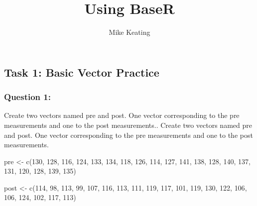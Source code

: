 \documentclass[
  letterpaper,
  DIV=11,
  numbers=noendperiod]{scrartcl}
\title{Using BaseR}
\author{Mike Keating}
\date{}
\newenvironment{Shaded}{\begin{snugshade}}{\end{snugshade}}
\newcommand{\DecValTok}[1]{\textcolor[rgb]{0.68,0.00,0.00}{#1}}
\newcommand{\FunctionTok}[1]{\textcolor[rgb]{0.28,0.35,0.67}{#1}}
\newcommand{\NormalTok}[1]{\textcolor[rgb]{0.00,0.23,0.31}{#1}}
\newcommand{\OtherTok}[1]{\textcolor[rgb]{0.00,0.23,0.31}{#1}}
\begin{document}
\maketitle


\subsection{Task 1: Basic Vector
Practice}\label{task-1-basic-vector-practice}

\subsubsection{Question 1:}\label{question-1}

Create two vectors named pre and post. One vector corresponding to the
pre measurements and one to the post measurements.. Create two vectors
named pre and post. One vector corresponding to the pre measurements and
one to the post measurements.

\begin{Shaded}
\begin{Highlighting}[]
\NormalTok{pre }\OtherTok{\textless{}{-}} \FunctionTok{c}\NormalTok{(}\DecValTok{130}\NormalTok{, }\DecValTok{128}\NormalTok{, }\DecValTok{116}\NormalTok{, }\DecValTok{124}\NormalTok{, }\DecValTok{133}\NormalTok{, }\DecValTok{134}\NormalTok{, }\DecValTok{118}\NormalTok{, }\DecValTok{126}\NormalTok{, }\DecValTok{114}\NormalTok{, }\DecValTok{127}\NormalTok{,}
         \DecValTok{141}\NormalTok{, }\DecValTok{138}\NormalTok{, }\DecValTok{128}\NormalTok{, }\DecValTok{140}\NormalTok{, }\DecValTok{137}\NormalTok{, }\DecValTok{131}\NormalTok{, }\DecValTok{120}\NormalTok{, }\DecValTok{128}\NormalTok{, }\DecValTok{139}\NormalTok{, }\DecValTok{135}\NormalTok{)}

\NormalTok{post }\OtherTok{\textless{}{-}} \FunctionTok{c}\NormalTok{(}\DecValTok{114}\NormalTok{, }\DecValTok{98}\NormalTok{, }\DecValTok{113}\NormalTok{, }\DecValTok{99}\NormalTok{, }\DecValTok{107}\NormalTok{, }\DecValTok{116}\NormalTok{, }\DecValTok{113}\NormalTok{, }\DecValTok{111}\NormalTok{, }\DecValTok{119}\NormalTok{, }\DecValTok{117}\NormalTok{,}
          \DecValTok{101}\NormalTok{, }\DecValTok{119}\NormalTok{, }\DecValTok{130}\NormalTok{, }\DecValTok{122}\NormalTok{, }\DecValTok{106}\NormalTok{, }\DecValTok{106}\NormalTok{, }\DecValTok{124}\NormalTok{, }\DecValTok{102}\NormalTok{, }\DecValTok{117}\NormalTok{, }\DecValTok{113}\NormalTok{)}
\end{Highlighting}
\end{Shaded}
\end{document}
